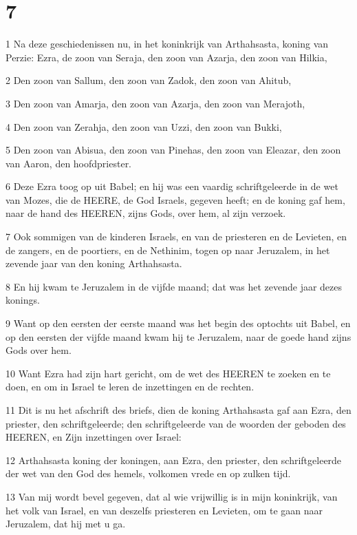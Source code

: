 \chapter{7}

\par 1 Na deze geschiedenissen nu, in het koninkrijk van Arthahsasta, koning van Perzie: Ezra, de zoon van Seraja, den zoon van Azarja, den zoon van Hilkia,
\par 2 Den zoon van Sallum, den zoon van Zadok, den zoon van Ahitub,
\par 3 Den zoon van Amarja, den zoon van Azarja, den zoon van Merajoth,
\par 4 Den zoon van Zerahja, den zoon van Uzzi, den zoon van Bukki,
\par 5 Den zoon van Abisua, den zoon van Pinehas, den zoon van Eleazar, den zoon van Aaron, den hoofdpriester.
\par 6 Deze Ezra toog op uit Babel; en hij was een vaardig schriftgeleerde in de wet van Mozes, die de HEERE, de God Israels, gegeven heeft; en de koning gaf hem, naar de hand des HEEREN, zijns Gods, over hem, al zijn verzoek.
\par 7 Ook sommigen van de kinderen Israels, en van de priesteren en de Levieten, en de zangers, en de poortiers, en de Nethinim, togen op naar Jeruzalem, in het zevende jaar van den koning Arthahsasta.
\par 8 En hij kwam te Jeruzalem in de vijfde maand; dat was het zevende jaar dezes konings.
\par 9 Want op den eersten der eerste maand was het begin des optochts uit Babel, en op den eersten der vijfde maand kwam hij te Jeruzalem, naar de goede hand zijns Gods over hem.
\par 10 Want Ezra had zijn hart gericht, om de wet des HEEREN te zoeken en te doen, en om in Israel te leren de inzettingen en de rechten.
\par 11 Dit is nu het afschrift des briefs, dien de koning Arthahsasta gaf aan Ezra, den priester, den schriftgeleerde; den schriftgeleerde van de woorden der geboden des HEEREN, en Zijn inzettingen over Israel:
\par 12 Arthahsasta koning der koningen, aan Ezra, den priester, den schriftgeleerde der wet van den God des hemels, volkomen vrede en op zulken tijd.
\par 13 Van mij wordt bevel gegeven, dat al wie vrijwillig is in mijn koninkrijk, van het volk van Israel, en van deszelfs priesteren en Levieten, om te gaan naar Jeruzalem, dat hij met u ga.
